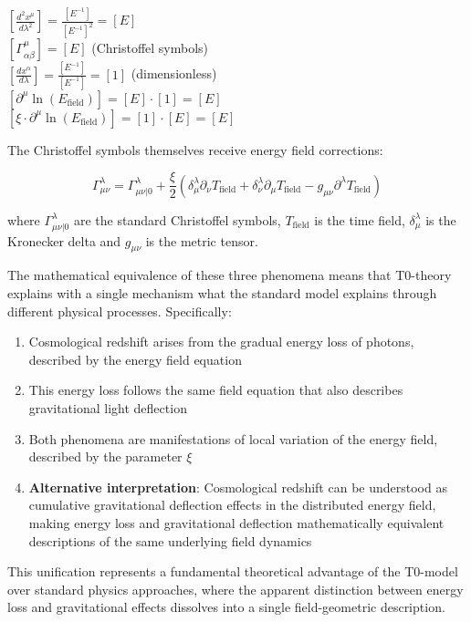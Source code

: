 \documentclass[12pt,a4paper]{article}
\newcommand{\tfield}{T_{\text{field}}}
\newcommand{\efield}{E_{\text{field}}}
\theoremstyle{definition}
\begin{document}
	\begin{dimanalysis}
		$\left[\frac{d^2 x^\mu}{d\lambda^2}\right] = \frac{[E^{-1}]}{[E^{-1}]^2} = [E]$\\
		$[\Gamma^\mu_{\alpha\beta}] = [E]$ (Christoffel symbols)\\
		$\left[\frac{dx^\alpha}{d\lambda}\right] = \frac{[E^{-1}]}{[E^{-1}]} = [1]$ (dimensionless)\\
		$[\partial^\mu \ln(\efield)] = [E] \cdot [1] = [E]$\\
		$[\xi \cdot \partial^\mu \ln(\efield)] = [1] \cdot [E] = [E]$ \checkmark
	\end{dimanalysis}
	
	The Christoffel symbols themselves receive energy field corrections:
	
	\begin{equation}
		\Gamma^\lambda_{\mu\nu} = \Gamma^\lambda_{\mu\nu|0} + \frac{\xi}{2} \left(\delta^\lambda_\mu \partial_\nu \tfield + \delta^\lambda_\nu \partial_\mu \tfield - g_{\mu\nu} \partial^\lambda \tfield\right)
	\end{equation}
	
	where $\Gamma^\lambda_{\mu\nu|0}$ are the standard Christoffel symbols, $\tfield$ is the time field, $\delta^\lambda_\mu$ is the Kronecker delta and $g_{\mu\nu}$ is the metric tensor.
	
	\begin{important}
		The mathematical equivalence of these three phenomena means that T0-theory explains with a single mechanism what the standard model explains through different physical processes. Specifically:
		
		\begin{enumerate}
			\item Cosmological redshift arises from the gradual energy loss of photons, described by the energy field equation
			\item This energy loss follows the same field equation that also describes gravitational light deflection
			\item Both phenomena are manifestations of local variation of the energy field, described by the parameter $\xi$
			\item \textbf{Alternative interpretation}: Cosmological redshift can be understood as cumulative gravitational deflection effects in the distributed energy field, making energy loss and gravitational deflection mathematically equivalent descriptions of the same underlying field dynamics
		\end{enumerate}
		
		This unification represents a fundamental theoretical advantage of the T0-model over standard physics approaches, where the apparent distinction between energy loss and gravitational effects dissolves into a single field-geometric description.
	\end{important}
	
\end{document}
